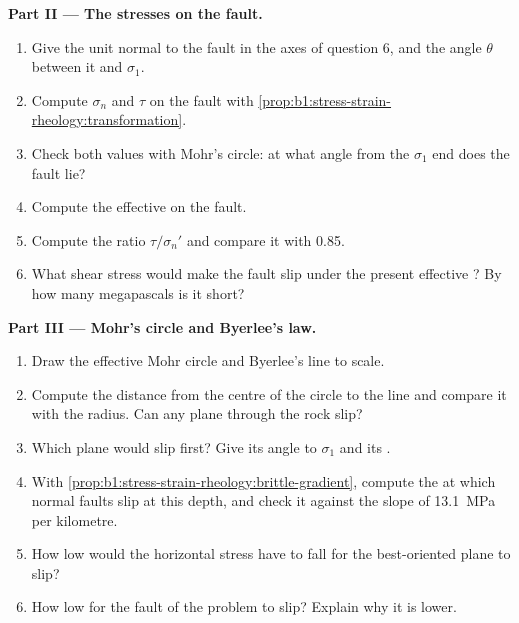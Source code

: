 \begin{problem}
\medskip
\noindent\textbf{Part II --- The stresses on the fault.}
\begin{enumerate}[resume]
  \item Give the unit normal to the fault in the axes of question 6, and the
        angle $\theta$ between it and $\sigma_1$.
  \item Compute $\sigma_n$ and $\tau$ on the fault with
        \cref{prop:b1:stress-strain-rheology:transformation}.
  \item Check both values with Mohr's circle: at what angle from the $\sigma_1$
        end does the fault lie?
  \item Compute the effective  on the fault.
  \item Compute the ratio $\tau/\sigma_n'$ and compare it with 0.85.
  \item What shear stress would make the fault slip under the present
        effective ? By how many megapascals is it short?
\end{enumerate}

\medskip
\noindent\textbf{Part III --- Mohr's circle and Byerlee's law.}
\begin{enumerate}[resume]
  \item Draw the effective Mohr circle and Byerlee's line to scale.
  \item Compute the distance from the centre of the circle to the line and
        compare it with the radius. Can any plane through the rock slip?
  \item Which plane would slip first? Give its angle to $\sigma_1$ and its .
  \item With \cref{prop:b1:stress-strain-rheology:brittle-gradient}, compute the
         at which normal faults slip at this depth, and
        check it against the slope of \qty{13.1}{MPa} per kilometre.
  \item How low would the horizontal stress have to fall for the best-oriented
        plane to slip?
  \item How low for the fault of the problem to slip? Explain why it is
        lower.
\end{enumerate}


\end{problem}
